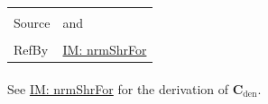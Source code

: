 \documentclass[12pt]{article}
\begin{document}
\begin{minipage}{\textwidth}
\begin{tabular}{>{\raggedright}p{}>{\raggedright\arraybackslash}p{}}
\\ \midrule \\
Source & \cite{chen2005} and \cite{karchewski2012}
         
\\ \midrule \\
RefBy & \hyperref[IM:nrmShrFor]{IM: nrmShrFor}
        
\\ \bottomrule
\end{tabular}
\end{minipage}
\paragraph{}
\label{IM:nrmShrForDenDeriv}
See \hyperref[IM:nrmShrFor]{IM: nrmShrFor} for the derivation of ${\mathbf{C}_{\text{den}}}$.
\end{document}
